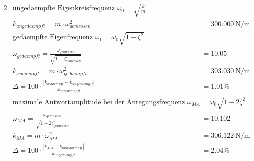 \begin{questions}
    \begin{solution}
        \begin{alignat*}{2}
            &\text{ungedaempfte Eigenkreisfrequenz  } \omega_0 = \sqrt{\frac{k}{m}} \\
            &k_{ungedaempft} = m \cdot \omega_{gemessen}^2 &&= \SI{300.000}{\newton \per \meter} \\
            &\text{gedaempfte Eigenfrequenz  } \omega_1 = \omega_0 \sqrt{1-\zeta^2} \\
            &\omega_{gedaempft} = \frac{\omega_{gemessen}}{\sqrt{1-\zeta_{gemessen}^2}} &&= 10.05\\
            &k_{gedaempft} = m \cdot \omega_{gedaempft}^2 &&= \SI{303.030}{\newton \per \meter}\\
            &\Delta = 100 \cdot \frac{|k_{gedaempft} - k_{ungedaempft}|}{k_{ungedaempft}} &&= 1.01 \%\\
            &\text{maximale Antwortamplitude bei der Anregungsfrequenz  } \omega_{MA} = \omega_0 \sqrt{1-2 \zeta^2} \\
            &\omega_{MA} = \frac{\omega_{gemessen}}{\sqrt{1-2\zeta_{gemessen}^2}} &&= 10.102\\
            &k_{MA} = m \cdot \omega_{MA}^2 &&= \SI{306.122}{\newton \per \meter}\\
            &\Delta = 100 \cdot \frac{|k_{MA} - k_{ungedaempft}|}{k_{ungedaempft}} &&= 2.04 \% \\ 
        \end{alignat*}
    \end{solution}

\end{questions}
